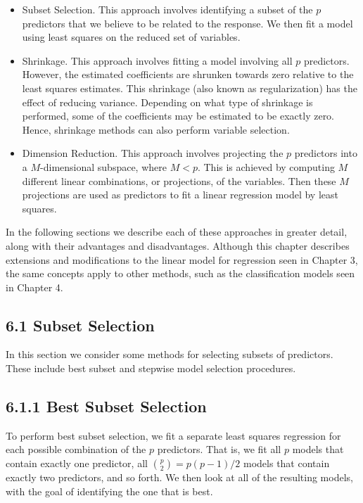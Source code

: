 \documentclass[10pt]{article}
\begin{document}
\begin{itemize}
  \item Subset Selection. This approach involves identifying a subset of the $p$ predictors that we believe to be related to the response. We then fit a model using least squares on the reduced set of variables.
  \item Shrinkage. This approach involves fitting a model involving all $p$ predictors. However, the estimated coefficients are shrunken towards zero relative to the least squares estimates. This shrinkage (also known as regularization) has the effect of reducing variance. Depending on what type of shrinkage is performed, some of the coefficients may be estimated to be exactly zero. Hence, shrinkage methods can also perform variable selection.
  \item Dimension Reduction. This approach involves projecting the $p$ predictors into a $M$-dimensional subspace, where $M<p$. This is achieved by computing $M$ different linear combinations, or projections, of the variables. Then these $M$ projections are used as predictors to fit a linear regression model by least squares.
\end{itemize}

In the following sections we describe each of these approaches in greater detail, along with their advantages and disadvantages. Although this chapter describes extensions and modifications to the linear model for regression seen in Chapter 3, the same concepts apply to other methods, such as the classification models seen in Chapter 4.


\subsection*{6.1 Subset Selection}
In this section we consider some methods for selecting subsets of predictors. These include best subset and stepwise model selection procedures.

\subsection*{6.1.1 Best Subset Selection}
To perform best subset selection, we fit a separate least squares regression for each possible combination of the $p$ predictors. That is, we fit all $p$ models that contain exactly one predictor, all $\binom{p}{2}=p(p-1) / 2$ models that contain exactly two predictors, and so forth. We then look at all of the resulting models, with the goal of identifying the one that is best.
\end{document}
